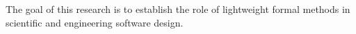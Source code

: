 \documentclass[../../proposal.tex]{subfiles}
\begin{document}
The goal of this research is to establish the role of lightweight formal methods in scientific and engineering software design. 
\end{document}

